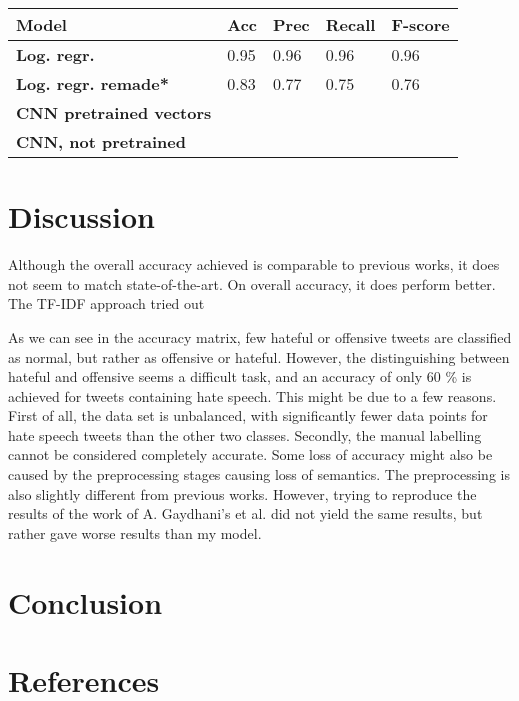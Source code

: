 \documentclass[twocolumn]{article}
\begin{document}
\begin{table}[h]
\label{tab:top_results}

\begin{tabular}{|l|l|l|l|l|}
\hline
\textbf{Model}                                                                     & \textbf{Acc} & \textbf{Prec} & \textbf{Recall} & \textbf{F-score} \\ \hline
\textbf{Log. regr. \cite{gaydhani}} &            0.95               &         0.96           &       0.96          &        0.96           \\ \hline
\textbf{Log. regr. remade*}                   &            0.83               &         0.77           &         0.75        &      0.76             \\ \hline
\textbf{CNN pretrained vectors}                                       &                           &                    &                 &                   \\ \hline
\textbf{CNN, not pretrained}                                      &                           &                    &                 &                   \\ \hline
\end{tabular}%
\end{table}

\section{Discussion}

Although the overall accuracy achieved is comparable to previous works, it does not seem to match state-of-the-art. On overall accuracy, it does perform better. The TF-IDF approach tried out 

As we can see in the accuracy matrix, few hateful or offensive tweets are classified as normal, but rather as offensive or hateful. However, the distinguishing between hateful and offensive seems a difficult task, and an accuracy of only 60 \% is achieved for tweets containing hate speech. This might be due to a few reasons. First of all, the data set is unbalanced, with significantly fewer data points for hate speech tweets than the other two classes. Secondly, the manual labelling cannot be considered completely accurate. Some loss of accuracy might also be caused by the preprocessing stages causing loss of semantics. The preprocessing is also slightly different from previous works. However, trying to reproduce the results of the work of A. Gaydhani's et al. \cite{gaydhani} did not yield the same results, but rather gave worse results than my model. 

\section{Conclusion}

\section{References}


\end{document}
